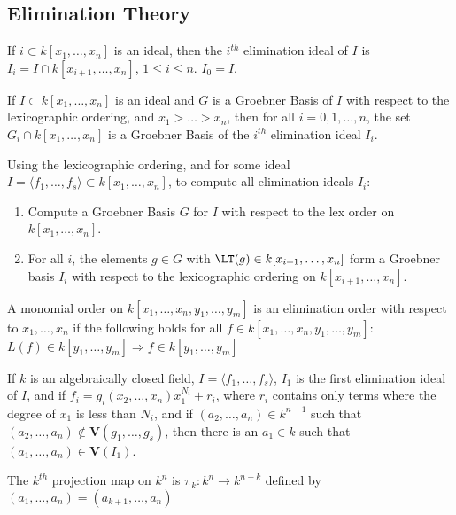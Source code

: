 \documentclass[crop=false,class=book,oneside]{standalone}
\begin{document}
\subsection{Elimination Theory}
\begin{definition}
If $i\subset k[x_1,\hdots ,x_n]$ is an ideal, then the $i^{th}$ elimination ideal of $I$ is $I_{i} = I\cap k[x_{i+1},\hdots, x_n]$, $1\leq i \leq n$. $I_{0} = I$.
\end{definition}
\begin{theorem}
If $I\subset k[x_1,\hdots ,x_n]$ is an ideal and $G$ is a Groebner Basis of $I$ with respect to the lexicographic ordering, and $x_1>\hdots > x_n$, then for all $i=0,1,\hdots, n$, the set $G_i \cap k[x_1,\hdots ,x_n]$ is a Groebner Basis of the $i^{th}$ elimination ideal $I_{i}$.
\end{theorem}
\begin{remark}
Using the lexicographic ordering, and for some ideal $I = \langle f_1,\hdots, f_s\rangle \subset k[x_1,\hdots ,x_n]$, to compute all elimination ideals $I_{i}$:
\begin{enumerate}
    \item Compute a Groebner Basis $G$ for $I$ with respect to the lex order on $k[x_1,\hdots ,x_n]$.
    \item For all $i$, the elements $g\in G$ with $\LT(g)\in k[x_{i+1},\hdots, x_n]$ form a Groebner basis $I_{i}$ with respect to the lexicographic ordering on $k[x_{i+1},\hdots, x_n]$.
\end{enumerate}
\end{remark}
\begin{definition}
A monomial order on $k[x_1,\hdots, x_n,y_1,\hdots, y_m]$ is an elimination order with respect to $x_1,\hdots, x_n$ if the following holds for all $f\in k[x_1,\hdots, x_n, y_1, \hdots, y_m]$: $L(f) \in k[y_1,\hdots, y_m] \Rightarrow f\in k[y_1,\hdots, y_m]$
\end{definition}
\begin{theorem}
If $k$ is an algebraically closed field, $I = \langle f_1,\hdots, f_s\rangle$, $I_{1}$ is the first elimination ideal of $I$, and if $f_i = g_i(x_2,\hdots, x_n)x_1^{N_i}+r_i$, where $r_i$ contains only terms where the degree of $x_1$ is less than $N_i$, and if $(a_2,\hdots, a_n)\in k^{n-1}$ such that $(a_2,\hdots, a_n) \notin \mathbf{V}(g_1,\hdots, g_s)$, then there is an $a_1 \in k$ such that $(a_1,\hdots, a_n) \in \mathbf{V}(I_1)$.
\end{theorem}
\begin{definition}
The $k^{th}$ projection map on $k^n$ is $\pi_{k}: k^n\rightarrow k^{n-k}$ defined by $(a_1,\hdots, a_n) = (a_{k+1},\hdots, a_n)$
\end{definition}
\end{document}
